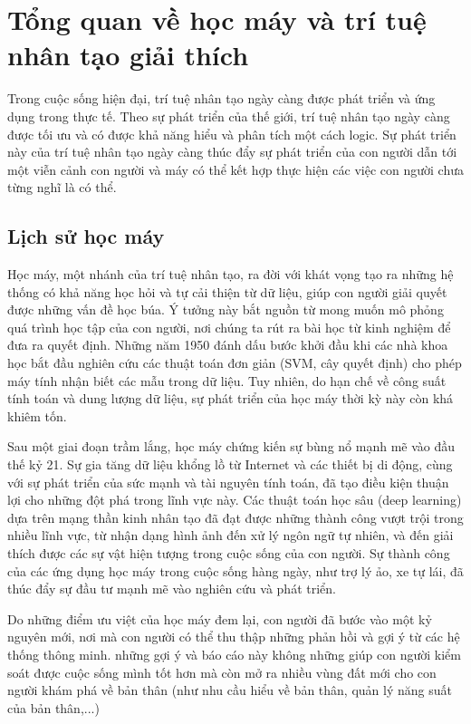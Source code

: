\section{Tổng quan về học máy và trí tuệ nhân tạo giải thích}
Trong cuộc sống hiện đại, trí tuệ nhân tạo ngày càng được phát triển và ứng dụng trong thực tế. Theo sự phát triển của thế giới, trí tuệ nhân tạo ngày càng được tối ưu và có được khả năng hiểu và phân tích một cách logic. Sự phát triển này của trí tuệ nhân tạo ngày càng thúc đẩy sự phát triển của con người dẫn tới một viễn cảnh con người và máy có thể kết hợp thực hiện các việc con người chưa từng nghĩ là có thể.
\subsection{Lịch sử học máy}
Học máy, một nhánh của trí tuệ nhân tạo, ra đời với khát vọng tạo ra những hệ thống có khả năng học hỏi và tự cải thiện từ dữ liệu, giúp con người giải quyết được những vấn đề học búa. Ý tưởng này bắt nguồn từ mong muốn mô phỏng quá trình học tập của con người, nơi chúng ta rút ra bài học từ kinh nghiệm để đưa ra quyết định. Những năm 1950 đánh dấu bước khởi đầu khi các nhà khoa học bắt đầu nghiên cứu các thuật toán đơn giản (SVM, cây quyết định) cho phép máy tính nhận biết các mẫu trong dữ liệu. Tuy nhiên, do hạn chế về công suất tính toán và dung lượng dữ liệu, sự phát triển của học máy thời kỳ này còn khá khiêm tốn.

Sau một giai đoạn trầm lắng, học máy chứng kiến sự bùng nổ mạnh mẽ vào đầu thế kỷ 21. Sự gia tăng dữ liệu khổng lồ từ Internet và các thiết bị di động, cùng với sự phát triển của sức mạnh và tài nguyên tính toán, đã tạo điều kiện thuận lợi cho những đột phá trong lĩnh vực này. Các thuật toán học sâu (deep learning) dựa trên mạng thần kinh nhân tạo đã đạt được những thành công vượt trội trong nhiều lĩnh vực, từ nhận dạng hình ảnh đến xử lý ngôn ngữ tự nhiên, và đến giải thích được các sự vật hiện tượng trong cuộc sống của con người. Sự thành công của các ứng dụng học máy trong cuộc sống hàng ngày, như trợ lý ảo, xe tự lái, đã thúc đẩy sự đầu tư mạnh mẽ vào nghiên cứu và phát triển.

Do những điểm ưu việt của học máy đem lại, con người đã bước vào một kỷ nguyên mới, nơi mà con người có thể thu thập những phản hồi và gợi ý từ các hệ thống thông minh. những gợi ý và báo cáo này không những giúp con người kiểm soát được cuộc sống mình tốt hơn mà còn mở ra nhiều vùng đất mới cho con người khám phá về bản thân (như nhu cầu hiểu về bản thân, quản lý năng suất của bản thân,...)

